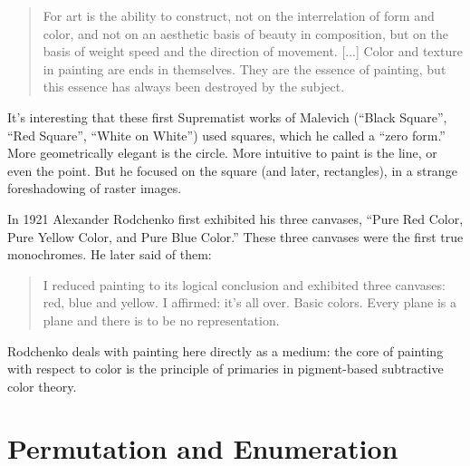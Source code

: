 \documentclass{thesis}
\begin{document}
	\begin{quote}
	For art is the ability to construct, not on the interrelation of form and color, and not on an aesthetic basis of beauty in composition, but on the basis of weight speed and the direction of movement. [...] Color and texture in painting are ends in themselves. They are the essence of painting, but this essence has always been destroyed by the subject.
	\end{quote}
	
	It's interesting that these first Suprematist works of Malevich (``Black Square'', ``Red Square'', ``White on White'') used squares, which he called a ``zero form.'' More geometrically elegant is the circle. More intuitive to paint is the line, or even the point. But he focused on the square (and later, rectangles), in a strange foreshadowing of raster images.
	
	\cite{moma_rodchenko_1998}
	In 1921 Alexander Rodchenko first exhibited his three canvases, ``Pure Red Color, Pure Yellow Color, and Pure Blue Color.'' These three canvases were the first true monochromes. He later said of them:
	
	\begin{quote}
	I reduced painting to its logical conclusion and exhibited three canvases: red, blue and yellow. I affirmed: it's all over. Basic colors. Every plane is a plane and there is to be no representation.
	\end{quote}
	
	Rodchenko deals with painting here directly as a medium: the core of painting with respect to color is the principle of primaries in pigment-based subtractive color theory.
	
\section{Permutation and Enumeration}
	\cite{boolos_computability_2002}\cite{borges_aleph_2004}\cite{borges_library_2000}
	\cite{christian_scheib_statics_????}\cite{jim_campbell_end_1996}\cite{john_f._simon_jr._every_????}
	\cite{john_f._simon_jr._given:32_1997}\cite{kyle_mcdonald_nandhopper_2008}\cite{kyle_mcdonald_pppd_2009}
	\cite{leander_seige_imagen_????}\cite{leonardo_solaas_magic_????}\cite{matthew_mirapaul_in_1997}
	\cite{michael_aschauer_8-bit_????}\cite{nattiez_music_1990}\cite{remko_scha_every_2001}\cite{sintron_gods_2003}
	\cite{tomczak_all_2009}\cite{tomczak_hardware-based_2009}\cite{alexander_christiaan_jacob_allrgb_2008}
	\cite{allan_mccollum_shapes_2006}\cite{jem_finer_longplayer_????}\cite{john_cage_as_????}\cite{paul_slocum_pi_2007}
	\cite{brian_whitman_eigenradio_2005}\cite{keith_f._lynch_converting_????}
	\cite{tom_johnson_liner_1999}
	
\end{document}
